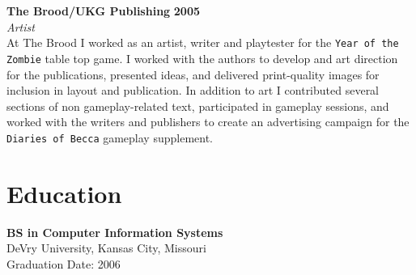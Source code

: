 \documentclass[margin,line]{resume}
\begin{document}
\begin{resume}
\textbf{The Brood/UKG Publishing} \hfill \textbf{2005}\vspace{1mm}\\\vspace{1mm}%
\textit{\small{Artist}}\vspace{1mm}\\\vspace{0mm}%
At The Brood I worked as an artist, writer and playtester for the {\tt Year of
the Zombie} table top game. I worked with the authors to develop and art
direction for the publications, presented ideas, and delivered print-quality
images for inclusion in layout and publication. In addition to art I
contributed several sections of non gameplay-related text, participated in
gameplay sessions, and worked with the writers and publishers to create an
advertising campaign for the {\tt Diaries of Becca} gameplay supplement.

\section{\mysidestyle \textbf{Education}}
\textbf{BS in Computer Information Systems}\\ DeVry University, Kansas City, Missouri\vspace{1mm}\\\vspace{0mm}%
Graduation Date: 2006

\end{resume}
\end{document}
